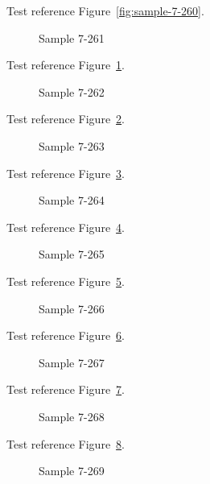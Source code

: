 Test reference Figure~\ref{fig:sample-7-260}.

\begin{figure}[tbhp]
\caption{Sample 7-261}
\label{fig:sample-7-261}
\end{figure}

Test reference Figure~\ref{fig:sample-7-261}.

\begin{figure}[tbhp]
\caption{Sample 7-262}
\label{fig:sample-7-262}
\end{figure}

Test reference Figure~\ref{fig:sample-7-262}.

\begin{figure}[tbhp]
\caption{Sample 7-263}
\label{fig:sample-7-263}
\end{figure}

Test reference Figure~\ref{fig:sample-7-263}.

\begin{figure}[tbhp]
\caption{Sample 7-264}
\label{fig:sample-7-264}
\end{figure}

Test reference Figure~\ref{fig:sample-7-264}.

\begin{figure}[tbhp]
\caption{Sample 7-265}
\label{fig:sample-7-265}
\end{figure}

Test reference Figure~\ref{fig:sample-7-265}.

\begin{figure}[tbhp]
\caption{Sample 7-266}
\label{fig:sample-7-266}
\end{figure}

Test reference Figure~\ref{fig:sample-7-266}.

\begin{figure}[tbhp]
\caption{Sample 7-267}
\label{fig:sample-7-267}
\end{figure}

Test reference Figure~\ref{fig:sample-7-267}.

\begin{figure}[tbhp]
\caption{Sample 7-268}
\label{fig:sample-7-268}
\end{figure}

Test reference Figure~\ref{fig:sample-7-268}.

\begin{figure}[tbhp]
\caption{Sample 7-269}
\label{fig:sample-7-269}
\end{figure}

